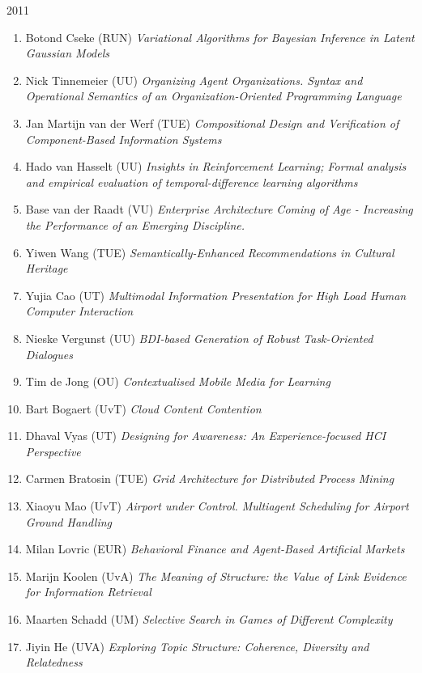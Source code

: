 \begin{multicols}{2}
\begin{scriptsize}
2011
\begin{enumerate}[leftmargin=*,noitemsep,topsep=0pt,parsep=1pt,partopsep=0pt]
\renewcommand{\labelenumi}{2011-\arabic{enumi}}
\item Botond Cseke (RUN) \textit{Variational Algorithms for Bayesian Inference in Latent Gaussian Models
}\item Nick Tinnemeier (UU) \textit{Organizing Agent Organizations. Syntax and Operational Semantics of an Organization-Oriented Programming Language
}\item Jan Martijn van der Werf (TUE) \textit{Compositional Design and Verification of Component-Based Information Systems
}\item Hado van Hasselt (UU) \textit{Insights in Reinforcement Learning; Formal analysis and empirical evaluation of temporal-difference learning algorithms
}\item Base van der Raadt (VU) \textit{Enterprise Architecture Coming of Age - Increasing the Performance of an Emerging Discipline.
}\item Yiwen Wang (TUE) \textit{Semantically-Enhanced Recommendations in Cultural Heritage
}\item Yujia Cao (UT) \textit{Multimodal Information Presentation for High Load Human Computer Interaction
}\item Nieske Vergunst (UU) \textit{BDI-based Generation of Robust Task-Oriented Dialogues
}\item Tim de Jong (OU) \textit{Contextualised Mobile Media for Learning
}\item Bart Bogaert (UvT) \textit{Cloud Content Contention
}\item Dhaval Vyas (UT) \textit{Designing for Awareness: An Experience-focused HCI Perspective
}\item Carmen Bratosin (TUE) \textit{Grid Architecture for Distributed Process Mining
}\item Xiaoyu Mao (UvT) \textit{Airport under Control. Multiagent Scheduling for Airport Ground Handling
}\item Milan Lovric (EUR) \textit{Behavioral Finance and Agent-Based Artificial Markets
}\item Marijn Koolen (UvA) \textit{The Meaning of Structure: the Value of Link Evidence for Information Retrieval
}\item Maarten Schadd (UM) \textit{Selective Search in Games of Different Complexity
}\item Jiyin He (UVA) \textit{Exploring Topic Structure: Coherence, Diversity and Relatedness
}
\end{enumerate}
\end{scriptsize}
\end{multicols}
